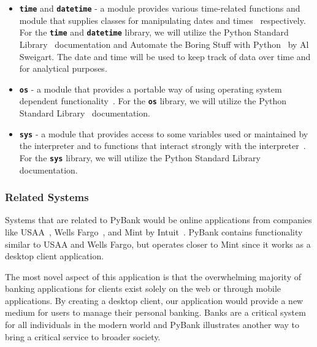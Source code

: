 \begin{itemize}
    \item {\texttt{\textbf{time}} and \texttt{\textbf{datetime}} - a module provides various time-related functions and module that supplies classes for manipulating dates and times~\cite{THE_PYTHON_STANDARD_LIBRARY:3} respectively. For the \texttt{\textbf{time}} and \texttt{\textbf{datetime}} library, we will utilize the Python Standard Library~\cite{THE_PYTHON_STANDARD_LIBRARY:3} documentation and Automate the Boring Stuff with Python~\cite{PYTHON_AUTOMATE_THE_BORING_STUFF:10} by Al Sweigart. The date and time will be used to keep track of data over time and for analytical purposes.}
    \item {\texttt{\textbf{os}} - a module that provides a portable way of using operating system dependent functionality~\cite{THE_PYTHON_STANDARD_LIBRARY:3}. For the \texttt{\textbf{os}} library, we will utilize the Python Standard Library~\cite{THE_PYTHON_STANDARD_LIBRARY:3} documentation.}
    \item {\texttt{\textbf{sys}} - a module that provides access to some variables used or maintained by the interpreter and to functions that interact strongly with the interpreter~\cite{THE_PYTHON_STANDARD_LIBRARY:3}. For the \texttt{\textbf{sys}} library, we will utilize the Python Standard Library~\cite{THE_PYTHON_STANDARD_LIBRARY:3} documentation.}
\end{itemize}

\newpage

\subsubsection{Related Systems}
\label{sect:related_systems}

Systems that are related to PyBank would be online applications from companies like USAA~\cite{USAA:6}, Wells Fargo~\cite{WELLS_FARGO:7}, and Mint by Intuit~\cite{MINT:5}. PyBank contains functionality similar to USAA and Wells Fargo, but operates closer to Mint since it works as a desktop client application. 

The most novel aspect of this application is that the overwhelming majority of banking applications for clients exist solely on the web or through mobile applications. By creating a desktop client, our application would provide a new medium for users to manage their personal banking. Banks are a critical system for all individuals in the modern world and PyBank illustrates another way to bring a critical service to broader society.

